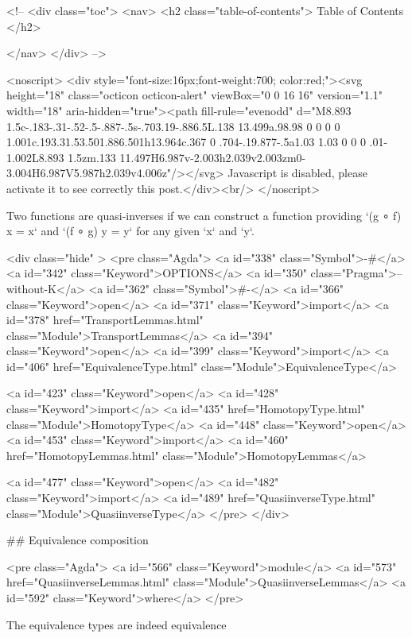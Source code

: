   <!-- 
  <div class="toc">
    <nav>
    <h2 class="table-of-contents"> Table of Contents </h2>
      

    </nav>
  </div>
   -->

  <noscript>
  <div style="font-size:16px;font-weight:700; color:red;"><svg height="18" class="octicon octicon-alert" viewBox="0 0 16 16" version="1.1" width="18" aria-hidden="true"><path fill-rule="evenodd" d="M8.893 1.5c-.183-.31-.52-.5-.887-.5s-.703.19-.886.5L.138 13.499a.98.98 0 0 0 0 1.001c.193.31.53.501.886.501h13.964c.367 0 .704-.19.877-.5a1.03 1.03 0 0 0 .01-1.002L8.893 1.5zm.133 11.497H6.987v-2.003h2.039v2.003zm0-3.004H6.987V5.987h2.039v4.006z"/></svg> Javascript is disabled, please activate it to see correctly this post.</div><br/>
  </noscript>

  Two functions are quasi-inverses if we can construct a function providing
`(g ∘ f) x = x` and `(f ∘ g) y = y` for any given `x` and `y`.

<div class="hide" >
<pre class="Agda">
<a id="338" class="Symbol">{-#</a> <a id="342" class="Keyword">OPTIONS</a> <a id="350" class="Pragma">--without-K</a> <a id="362" class="Symbol">#-}</a>
<a id="366" class="Keyword">open</a> <a id="371" class="Keyword">import</a> <a id="378" href="TransportLemmas.html" class="Module">TransportLemmas</a>
<a id="394" class="Keyword">open</a> <a id="399" class="Keyword">import</a> <a id="406" href="EquivalenceType.html" class="Module">EquivalenceType</a>

<a id="423" class="Keyword">open</a> <a id="428" class="Keyword">import</a> <a id="435" href="HomotopyType.html" class="Module">HomotopyType</a>
<a id="448" class="Keyword">open</a> <a id="453" class="Keyword">import</a> <a id="460" href="HomotopyLemmas.html" class="Module">HomotopyLemmas</a>


<a id="477" class="Keyword">open</a> <a id="482" class="Keyword">import</a> <a id="489" href="QuasiinverseType.html" class="Module">QuasiinverseType</a>
</pre>
</div>

## Equivalence composition

<pre class="Agda">
<a id="566" class="Keyword">module</a> <a id="573" href="QuasiinverseLemmas.html" class="Module">QuasiinverseLemmas</a> <a id="592" class="Keyword">where</a>
</pre>

The equivalence types are indeed equivalence

